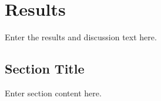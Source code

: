 \chapter{Results}
\label{chap:results}

Enter the results and discussion text here.

\section{Section Title}

Enter section content here.
